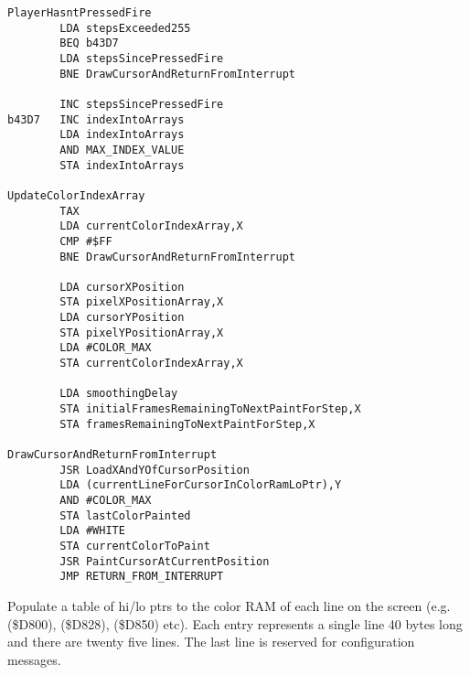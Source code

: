 \clearpage
\begin{lstlisting}
PlayerHasntPressedFire   
        LDA stepsExceeded255
        BEQ b43D7
        LDA stepsSincePressedFire
        BNE DrawCursorAndReturnFromInterrupt

        INC stepsSincePressedFire
b43D7   INC indexIntoArrays
        LDA indexIntoArrays
        AND MAX_INDEX_VALUE
        STA indexIntoArrays

UpdateColorIndexArray  
        TAX 
        LDA currentColorIndexArray,X
        CMP #$FF
        BNE DrawCursorAndReturnFromInterrupt

        LDA cursorXPosition
        STA pixelXPositionArray,X
        LDA cursorYPosition
        STA pixelYPositionArray,X
        LDA #COLOR_MAX
        STA currentColorIndexArray,X

        LDA smoothingDelay
        STA initialFramesRemainingToNextPaintForStep,X
        STA framesRemainingToNextPaintForStep,X

DrawCursorAndReturnFromInterrupt   
        JSR LoadXAndYOfCursorPosition
        LDA (currentLineForCursorInColorRamLoPtr),Y
        AND #COLOR_MAX
        STA lastColorPainted
        LDA #WHITE
        STA currentColorToPaint
        JSR PaintCursorAtCurrentPosition
        JMP RETURN_FROM_INTERRUPT

\end{lstlisting}
\clearpage

Populate a table of hi/lo ptrs to the color RAM
of each line on the screen (e.g. \icode(\$D800), \icode(\$D828), \icode(\$D850) etc). Each entry represents a single
line 40 bytes long and there are twenty five lines.
The last line is reserved for configuration messages.

